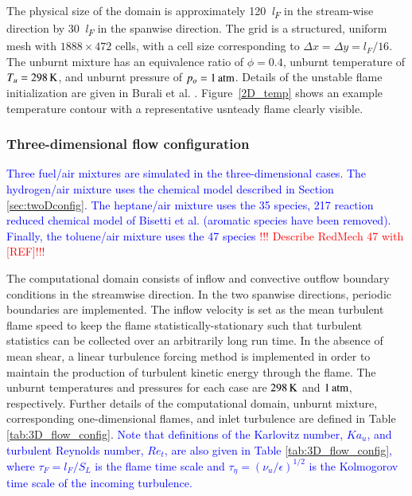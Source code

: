 \documentclass[preprint,review,12pt]{elsarticle}
\begin{document}
The physical size of the domain is approximately \SI{120}{\textit{l}_{\textit{F}}} in the stream-wise direction by \SI{30}{\textit{l}_{\textit{F}}} in the spanwise direction.
The grid is a structured, uniform mesh with $1888 \times 472$ cells, with a cell size corresponding to $\Delta x = \Delta y = l_{F}/16$.
The unburnt mixture has an equivalence ratio of $\phi = 0.4$, unburnt temperature of $T_u = 298\,\rm K$, and unburnt pressure of $p_o = 1\,\rm atm$.
Details of the unstable flame initialization are given in Burali et al. \cite{Burali2016AssessmentFlows}.
Figure~\ref{2D_temp} shows an example temperature contour with a representative usnteady flame clearly visible.

\subsubsection{Three-dimensional flow configuration}\label{sec:threeDconfig}
\textcolor{blue}{Three fuel/air mixtures are simulated in the three-dimensional cases.  The hydrogen/air mixture uses the chemical model described in Section \ref{sec:twoDconfig}.  
The heptane/air mixture uses the 35 species, 217 reaction reduced chemical model of Bisetti et al. \cite{mech35} (aromatic species have been removed).
Finally, the toluene/air mixture uses the 47 species \textcolor{red}{!!! Describe RedMech 47 with [REF]!!!}}

The computational domain consists of inflow and convective outflow boundary conditions in the streamwise direction.  
In the two spanwise directions, periodic boundaries are implemented. 
The inflow velocity is set as the mean turbulent flame speed to keep the flame statistically-stationary such that turbulent statistics can be collected over an arbitrarily long run time.
In the absence of mean shear, a linear turbulence forcing method \cite{Rosales2005,Carroll2013} is implemented in order to maintain the production of turbulent kinetic energy through the flame.
The unburnt temperatures and pressures for each case are $298\,\rm K$ and $1\,\rm atm$, respectively.
Further details of the computational domain, unburnt mixture, corresponding one-dimensional flames, and inlet turbulence are defined in Table \ref{tab:3D_flow_config}.
\textcolor{blue}{Note that definitions of the Karlovitz number, $Ka_u$, and turbulent Reynolds number, $Re_t$, are also given in Table \ref{tab:3D_flow_config}, where $\tau_F = l_F/S_L$ is the flame time scale and $\tau_{\eta}=\left(\nu_u/\epsilon\right)^{1/2}$ is the Kolmogorov time scale of the incoming turbulence.}
\end{document}
